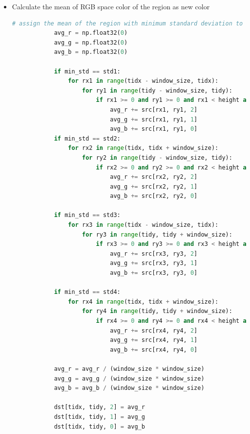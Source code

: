\documentclass{article}
\begin{document}
\begin{itemize}
    \item Calculate the mean of RGB space color of the region as new color

    \begin{lstlisting}[language=Python]
            # assign the mean of the region with minimum standard deviation to the pixel
            avg_r = np.float32(0)
            avg_g = np.float32(0)
            avg_b = np.float32(0)

            if min_std == std1:
                for rx1 in range(tidx - window_size, tidx): 
                    for ry1 in range(tidy - window_size, tidy): 
                        if rx1 >= 0 and ry1 >= 0 and rx1 < height and ry1 < width:
                            avg_r += src[rx1, ry1, 2]
                            avg_g += src[rx1, ry1, 1]
                            avg_b += src[rx1, ry1, 0]
            if min_std == std2:
                for rx2 in range(tidx, tidx + window_size): 
                    for ry2 in range(tidy - window_size, tidy): 
                        if rx2 >= 0 and ry2 >= 0 and rx2 < height and ry2 < width:
                            avg_r += src[rx2, ry2, 2]
                            avg_g += src[rx2, ry2, 1]
                            avg_b += src[rx2, ry2, 0]

            if min_std == std3:
                for rx3 in range(tidx - window_size, tidx): 
                    for ry3 in range(tidy, tidy + window_size): 
                        if rx3 >= 0 and ry3 >= 0 and rx3 < height and ry3 < width:
                            avg_r += src[rx3, ry3, 2]
                            avg_g += src[rx3, ry3, 1]
                            avg_b += src[rx3, ry3, 0]

            if min_std == std4:
                for rx4 in range(tidx, tidx + window_size): 
                    for ry4 in range(tidy, tidy + window_size): 
                        if rx4 >= 0 and ry4 >= 0 and rx4 < height and ry4 < width:
                            avg_r += src[rx4, ry4, 2]
                            avg_g += src[rx4, ry4, 1]
                            avg_b += src[rx4, ry4, 0]

            avg_r = avg_r / (window_size * window_size)
            avg_g = avg_g / (window_size * window_size)
            avg_b = avg_b / (window_size * window_size)

            dst[tidx, tidy, 2] = avg_r
            dst[tidx, tidy, 1] = avg_g
            dst[tidx, tidy, 0] = avg_b
    \end{lstlisting}
    
\end{itemize}
\newpage
\end{document}
